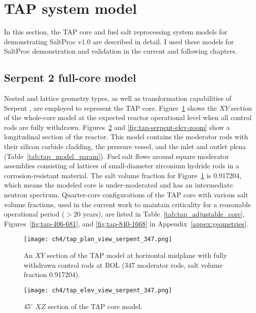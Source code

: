 \section{TAP system model} \label{sec:tap_model}
In this section, the \gls{TAP} core and fuel salt reprocessing system models  
for demonstrating SaltProc v1.0 are described in detail. I used these models 
for SaltProc demonstration and validation in the current and following 
chapters.

\subsection{Serpent 2 full-core model} 
Nested and lattice geometry types, as well as transformation capabilities of 
Serpent \cite{leppanen_serpent_2014}, are employed to represent the \gls{TAP} 
core. Figure~\ref{fig:tap-serpent-plan} shows the $XY$ section of the 
whole-core model at the expected reactor operational level when all control 
rods are fully withdrawn. Figures~\ref{fig:tap-serpent-elev} and 
\ref{fig:tap-serpent-elev-zoom} show a longitudinal section of the 
reactor. This model contains the moderator rods with their silicon carbide 
cladding, the pressure vessel, and the inlet and outlet plena 
(Table~\ref{tab:tap_model_param}). 
Fuel salt flows around square moderator assemblies consisting of lattices 
of small-diameter zirconium hydride rods in a corrosion-resistant material. 
The salt volume fraction for Figure~\ref{fig:tap-serpent-plan} is 0.917204, 
which means the modeled core is under-moderated and has an intermediate 
neutron spectrum. Quarter-core configurations of the \gls{TAP} core with 
various salt volume fractions, used in the current work to maintain 
criticality for a reasonable operational period ($>20$ years), are listed in 
Table~\ref{tab:tap_adjustable_core}, Figures~\ref{fig:tap-406-681}, and 
\ref{fig:tap-840-1668} in Appendix~\ref{appex:geometries}.
\begin{figure}[htp!] %
	\centering
	\texttt{[image: ch4/tap\_plan\_view\_serpent\_347.png]}
	\caption{An $XY$ section of the \gls{TAP} model at horizontal midplane 
		with fully withdrawn control rods at \gls{BOL} (347 moderator rods, 
		salt volume fraction 0.917204).}
	\label{fig:tap-serpent-plan}
\end{figure}

\begin{figure}[htp!] %
	\centering
	\texttt{[image: ch4/tap\_elev\_view\_serpent\_347.png]}
	\caption{45$^{\circ}$ $XZ$ section of the \gls{TAP} core model.}
	\label{fig:tap-serpent-elev}
\end{figure}

